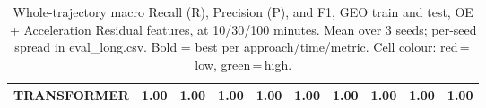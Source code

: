 \begin{table}[t]
{\begin{tabular}{l ccc ccc ccc}
\textbf{TRANSFORMER} & \cellcolor[HTML]{51CF66}\textbf{1.00} & \cellcolor[HTML]{51CF66}\textbf{1.00} & \cellcolor[HTML]{51CF66}\textbf{1.00} & \cellcolor[HTML]{51CF66}\textbf{1.00} & \cellcolor[HTML]{51CF66}\textbf{1.00} & \cellcolor[HTML]{51CF66}\textbf{1.00} & \cellcolor[HTML]{51CF66}1.00 & \cellcolor[HTML]{51CF66}1.00 & \cellcolor[HTML]{51CF66}1.00 \\
\bottomrule
\end{tabular}%
}
\caption{Whole-trajectory macro Recall (R), Precision (P), and F1, GEO train and test, OE + Acceleration Residual features, at 10/30/100 minutes. Mean over 3 seeds; per-seed spread in eval\_long.csv. Bold = best per approach/time/metric. Cell colour: red\,=\,low, green\,=\,high.}
\label{tab:total_geo_ladder}
\end{table}
